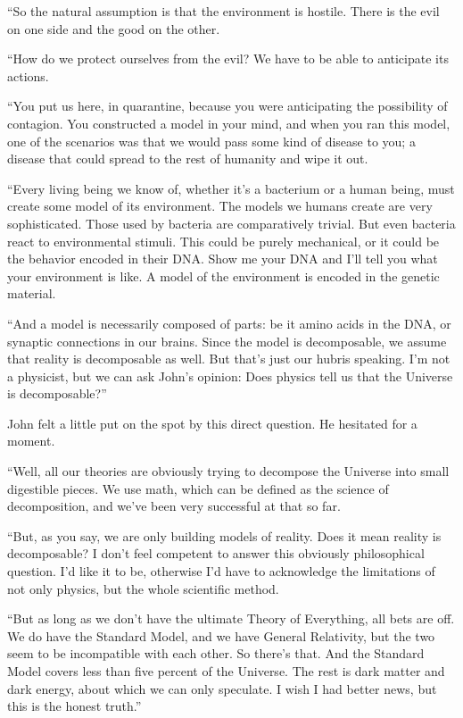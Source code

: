 \documentclass{memoir}
\begin{document}
``So the natural assumption is that the environment is hostile. There is the evil on one side and the good on the other. 

``How do we protect ourselves from the evil? We have to be able to anticipate its actions. 

``You put us here, in quarantine, because you were anticipating the possibility of contagion. You constructed a model in your mind, and when you ran this model, one of the scenarios was that we would pass some kind of disease to you; a disease that could spread to the rest of humanity and wipe it out.

``Every living being we know of, whether it's a bacterium or a human being, must create some model of its environment. The models we humans create are very sophisticated. Those used by bacteria are comparatively trivial. But even bacteria react to environmental stimuli. This could be purely mechanical, or it could be the behavior encoded in their DNA. Show me your DNA and I'll tell you what your environment is like. A model of the environment is encoded in the genetic material.

``And a model is necessarily composed of parts: be it amino acids in the DNA, or synaptic connections in our brains. Since the model is decomposable, we assume that reality is decomposable as well. But that's just our hubris speaking. I'm not a physicist, but we can ask John's opinion: Does physics tell us that the Universe is decomposable?''

John felt a little put on the spot by this direct question. He hesitated for a moment.

``Well, all our theories are obviously trying to decompose the Universe into small digestible pieces. We use math, which can be defined as the science of decomposition, and we've been very successful at that so far.

``But, as you say, we are only building models of reality. Does it mean reality is decomposable? I don't feel competent to answer this obviously philosophical question. I'd like it to be, otherwise I'd have to acknowledge the limitations of not only physics, but the whole scientific method.

``But as long as we don't have the ultimate Theory of Everything, all bets are off. We do have the Standard Model, and we have General Relativity, but the two seem to be incompatible with each other. So there's that. And the Standard Model covers less than five percent of the Universe. The rest is dark matter and dark energy, about which we can only speculate. I wish I had better news, but this is the honest truth.''
\end{document}

